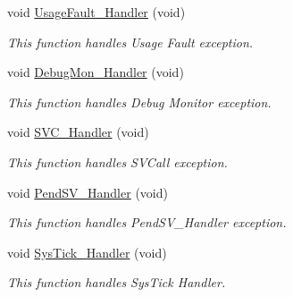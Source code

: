 \begin{DoxyCompactItemize}
void \hyperlink{group___t_i_m___complementary_signals_ga1d98923de2ed6b7309b66f9ba2971647}{Usage\-Fault\-\_\-\-Handler} (void)
\begin{DoxyCompactList}\small\item\em This function handles Usage Fault exception. \end{DoxyCompactList}\item 
void \hyperlink{group___t_i_m___complementary_signals_gadbdfb05858cc36fc520974df37ec3cb0}{Debug\-Mon\-\_\-\-Handler} (void)
\begin{DoxyCompactList}\small\item\em This function handles Debug Monitor exception. \end{DoxyCompactList}\item 
void \hyperlink{group___t_i_m___complementary_signals_ga3e5ddb3df0d62f2dc357e64a3f04a6ce}{S\-V\-C\-\_\-\-Handler} (void)
\begin{DoxyCompactList}\small\item\em This function handles S\-V\-Call exception. \end{DoxyCompactList}\item 
void \hyperlink{group___t_i_m___complementary_signals_ga6303e1f258cbdc1f970ce579cc015623}{Pend\-S\-V\-\_\-\-Handler} (void)
\begin{DoxyCompactList}\small\item\em This function handles Pend\-S\-V\-\_\-\-Handler exception. \end{DoxyCompactList}\item 
void \hyperlink{group___t_i_m___complementary_signals_gab5e09814056d617c521549e542639b7e}{Sys\-Tick\-\_\-\-Handler} (void)
\begin{DoxyCompactList}\small\item\em This function handles Sys\-Tick Handler. \end{DoxyCompactList}\end{DoxyCompactItemize}
